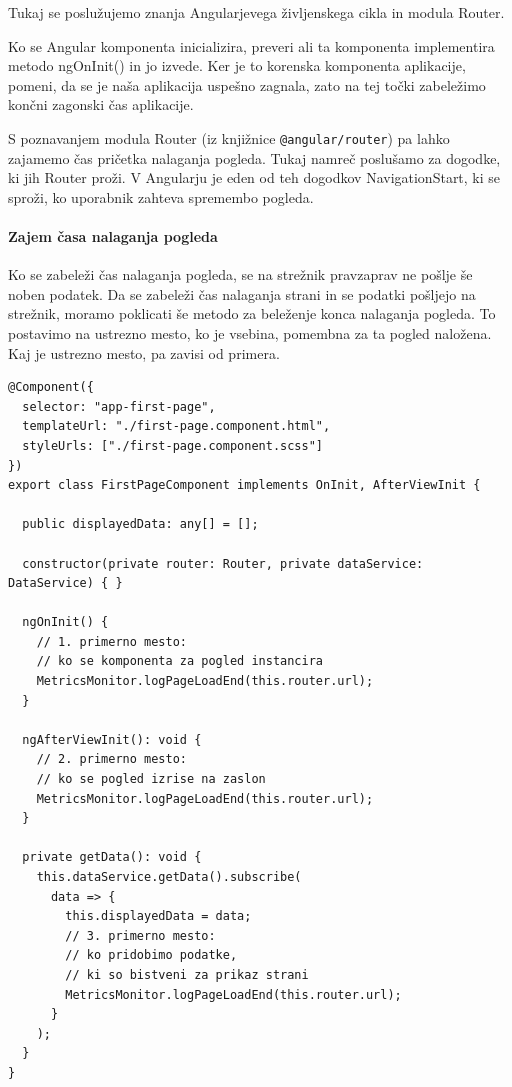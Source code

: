 \documentclass[a4paper, 12pt]{book}
\begin{document}
Tukaj se poslužujemo znanja Angularjevega življenskega cikla in modula Router.

Ko se Angular komponenta inicializira, preveri ali ta komponenta implementira metodo ngOnInit() in jo izvede. Ker je to korenska komponenta aplikacije, pomeni, da se je naša aplikacija uspešno zagnala, zato na tej točki zabeležimo končni zagonski čas aplikacije.

S poznavanjem modula Router (iz knjižnice \verb|@angular/router|) pa lahko zajamemo čas pričetka nalaganja pogleda. Tukaj namreč poslušamo za dogodke, ki jih Router proži. V Angularju je eden od teh dogodkov NavigationStart, ki se sproži, ko uporabnik zahteva spremembo pogleda.

\paragraph{Zajem časa nalaganja pogleda}

Ko se zabeleži čas nalaganja pogleda, se na strežnik pravzaprav ne pošlje še noben podatek. Da se zabeleži čas nalaganja strani in se podatki pošljejo na strežnik, moramo poklicati še metodo za beleženje konca nalaganja pogleda. To postavimo na ustrezno mesto, ko je vsebina, pomembna za ta pogled naložena. Kaj je ustrezno mesto, pa zavisi od primera.

\begin{lstlisting}[label=code:lib_page_comp, caption=Zajem časa nalaganja pogleda]
@Component({
  selector: "app-first-page",
  templateUrl: "./first-page.component.html",
  styleUrls: ["./first-page.component.scss"]
})
export class FirstPageComponent implements OnInit, AfterViewInit {

  public displayedData: any[] = [];

  constructor(private router: Router, private dataService: DataService) { }

  ngOnInit() {
    // 1. primerno mesto:
    // ko se komponenta za pogled instancira
    MetricsMonitor.logPageLoadEnd(this.router.url);
  }

  ngAfterViewInit(): void {
    // 2. primerno mesto:
    // ko se pogled izrise na zaslon
    MetricsMonitor.logPageLoadEnd(this.router.url);
  }

  private getData(): void {
    this.dataService.getData().subscribe(
      data => {
        this.displayedData = data;
        // 3. primerno mesto:
        // ko pridobimo podatke,
        // ki so bistveni za prikaz strani
        MetricsMonitor.logPageLoadEnd(this.router.url);
      }
    );
  }
}
\end{lstlisting}
\end{document}
